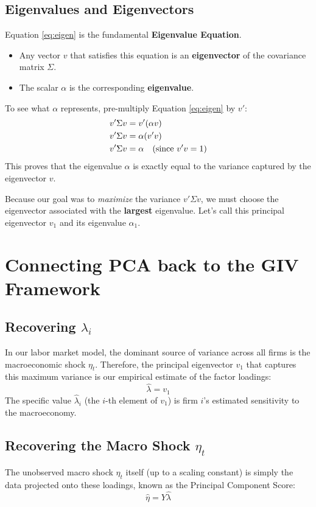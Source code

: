\documentclass[11pt]{article}
\begin{document}
\subsection{Eigenvalues and Eigenvectors}
Equation \ref{eq:eigen} is the fundamental \textbf{Eigenvalue Equation}. 
\begin{itemize}
    \item Any vector $v$ that satisfies this equation is an \textbf{eigenvector} of the covariance matrix $\Sigma$.
    \item The scalar $\alpha$ is the corresponding \textbf{eigenvalue}.
\end{itemize}

To see what $\alpha$ represents, pre-multiply Equation \ref{eq:eigen} by $v'$:
\begin{align}
    v' \Sigma v &= v' (\alpha v) \notag \\
    v' \Sigma v &= \alpha (v'v) \notag \\
    v' \Sigma v &= \alpha \quad \text{(since } v'v = 1 \text{)}
\end{align}
This proves that the eigenvalue $\alpha$ is exactly equal to the variance captured by the eigenvector $v$. 

Because our goal was to \textit{maximize} the variance $v' \Sigma v$, we must choose the eigenvector associated with the \textbf{largest} eigenvalue. Let's call this principal eigenvector $v_1$ and its eigenvalue $\alpha_1$.

\section{Connecting PCA back to the GIV Framework}

\subsection{Recovering $\lambda_i$}
In our labor market model, the dominant source of variance across all firms is the macroeconomic shock $\eta_t$. Therefore, the principal eigenvector $v_1$ that captures this maximum variance is our empirical estimate of the factor loadings:
\begin{equation}
    \hat{\lambda} = v_1
\end{equation}
The specific value $\hat{\lambda}_i$ (the $i$-th element of $v_1$) is firm $i$'s estimated sensitivity to the macroeconomy.

\subsection{Recovering the Macro Shock $\eta_t$}
The unobserved macro shock $\eta_t$ itself (up to a scaling constant) is simply the data projected onto these loadings, known as the Principal Component Score:
\begin{equation}
    \hat{\eta} = Y \hat{\lambda}
\end{equation}
\end{document}
